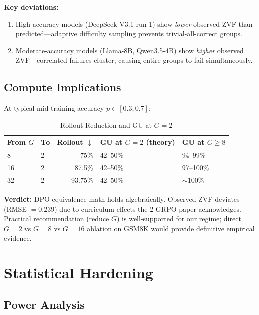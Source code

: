 \documentclass[12pt,a4paper]{report}
\theoremstyle{definition}
\begin{document}
\textbf{Key deviations:}
\begin{enumerate}[nosep]
\item High-accuracy models (DeepSeek-V3.1 run 1) show \emph{lower} observed ZVF than predicted---adaptive
      difficulty sampling prevents trivial-all-correct groups.
\item Moderate-accuracy models (Llama-8B, Qwen3.5-4B) show \emph{higher} observed ZVF---correlated
      failures cluster, causing entire groups to fail simultaneously.
\end{enumerate}

\subsection{Compute Implications}

At typical mid-training accuracy $p \in [0.3, 0.7]$:

\begin{table}[htbp]
\centering
\caption{Rollout Reduction and GU at $G = 2$}
\label{tab:2grpo-compute}
\begin{tabular}{llrll}
\toprule
\textbf{From $G$} & \textbf{To} & \textbf{Rollout} $\downarrow$ & \textbf{GU at $G=2$ (theory)} & \textbf{GU at $G \ge 8$} \\
\midrule
8  & 2 & 75\%   & 42--50\% & 94--99\% \\
16 & 2 & 87.5\% & 42--50\% & 97--100\% \\
32 & 2 & 93.75\% & 42--50\% & $\sim$100\% \\
\bottomrule
\end{tabular}
\end{table}

\textbf{Verdict:} DPO-equivalence math holds algebraically. Observed ZVF deviates (RMSE $= 0.239$) due
to curriculum effects the 2-GRPO paper acknowledges. Practical recommendation (reduce $G$) is
well-supported for our regime; direct $G = 2$ vs $G = 8$ vs $G = 16$ ablation on GSM8K would provide
definitive empirical evidence.

\section{Statistical Hardening}
\label{sec:statistical-hardening}

\subsection{Power Analysis}
\label{sec:power-analysis}
\end{document}
